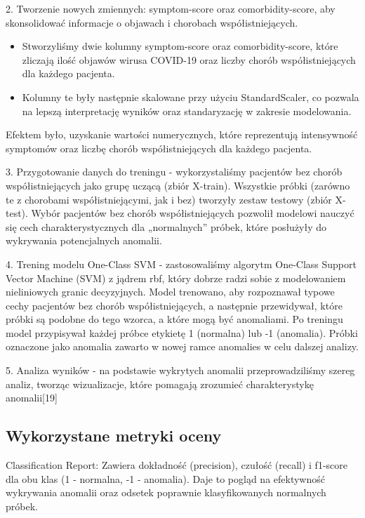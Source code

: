 \documentclass[a4paper,fleqn]{cas-dc}
\begin{document}
2. Tworzenie nowych zmiennych: symptom-score oraz comorbidity-score, aby skonsolidować informacje o objawach i chorobach współistniejących.
\begin{itemize} 
\item Stworzyliśmy dwie kolumny symptom-score oraz comorbidity-score, które zliczają ilość objawów wirusa COVID-19 oraz liczby chorób współistniejących dla każdego pacjenta.
\item  Kolumny te były następnie skalowane przy użyciu StandardScaler, co pozwala na lepszą interpretację wyników oraz standaryzację w zakresie modelowania.
\end{itemize}
Efektem było, uzyskanie wartości numerycznych, które reprezentują intensywność symptomów oraz liczbę chorób współistniejących dla każdego pacjenta.

3. Przygotowanie danych do treningu - wykorzystaliśmy pacjentów bez chorób współistniejących jako grupę uczącą (zbiór X-train). Wszystkie próbki (zarówno te z chorobami współistniejącymi, jak i bez) tworzyły zestaw testowy (zbiór X-test). 
Wybór pacjentów bez chorób współistniejących pozwolił modelowi nauczyć się cech charakterystycznych dla „normalnych” próbek, które posłużyły do wykrywania potencjalnych anomalii.

4. Trening modelu One-Class SVM - zastosowaliśmy algorytm One-Class Support Vector Machine (SVM) z jądrem rbf, który dobrze radzi sobie z modelowaniem nieliniowych granic decyzyjnych. Model trenowano, aby rozpoznawał typowe cechy pacjentów bez chorób współistniejących, a następnie przewidywał, które próbki są podobne do tego wzorca, a które mogą być anomaliami. Po treningu model przypisywał każdej próbce etykietę 1 (normalna) lub -1 (anomalia). Próbki oznaczone jako anomalia zawarto w nowej ramce anomalies w celu dalszej analizy.

5. Analiza wyników - na podstawie wykrytych anomalii przeprowadziliśmy szereg analiz, tworząc wizualizacje, które pomagają zrozumieć charakterystykę anomalii[19]

\subsection{Wykorzystane metryki oceny}

Classification Report: Zawiera dokładność (precision), czułość (recall) i f1-score dla obu klas (1 - normalna, -1 - anomalia). Daje to pogląd na efektywność wykrywania anomalii oraz odsetek poprawnie klasyfikowanych normalnych próbek.
\end{document}
